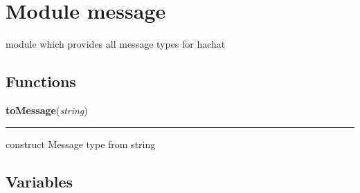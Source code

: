 %
%
%


\section{Module message}

    \label{message}
module which provides all message types for hachat



  \subsection{Functions}

    \label{message:toMessage}

    \vspace{0.5ex}

\hspace{.8\funcindent}\begin{boxedminipage}{\funcwidth}

    \raggedright \textbf{toMessage}(\textit{string})

    \vspace{-1.5ex}

    \rule{\textwidth}{0.5\fboxrule}
\setlength{\parskip}{2ex}
    construct Message type from string

\setlength{\parskip}{1ex}
    \end{boxedminipage}



  \subsection{Variables}

